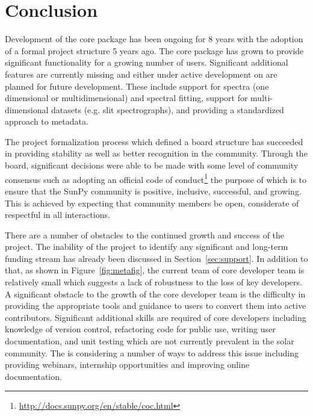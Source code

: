 \section{Conclusion}
\label{sec:conclusion}

Development of the \sunpypkg core package has been ongoing for 8 years with the adoption of a formal project structure 5 years ago.
The core package has grown to provide significant functionality for a growing number of users.
Significant additional features are currently missing and either under active development on are planned for future development.
These include support for spectra (one dimensional or multidimensional) and spectral fitting, support for multi-dimensional datasets (e.g. slit spectrographs), and providing a standardized approach to metadata.

The project formalization process which defined a board structure has succeeded in providing stability as well as better recognition in the community.
Through the board, significant decisions were able to be made with some level of community consensus such as adopting an official code of conduct\footnote{\url{http://docs.sunpy.org/en/stable/coc.html}} the purpose of which is to ensure that the SunPy community is positive, inclusive, successful, and growing.
This is achieved by expecting that community members be open, considerate of respectful in all interactions.

There are a number of obstacles to the continued growth and success of the project. The inability of the project to identify any significant and long-term funding stream has already been discussed in Section~\ref{sec:support}.
In addition to that, as shown in Figure~\ref{fig:metafig}, the current team of core developer team is relatively small which suggests a lack of robustness to the loss of key developers.
A significant obstacle to the growth of the core developer team is the difficulty in providing the appropriate tools and guidance to users to convert them into active contributors.
Significant additional skills are required of core developers including knowledge of version control, refactoring code for public use, writing user documentation, and unit testing which are not currently prevalent in the solar community.
The \sunpyproj is considering a number of ways to address this issue including providing webinars, internship opportunities and improving online documentation.

